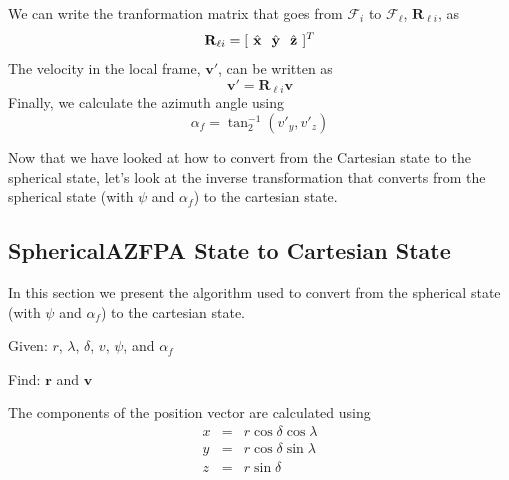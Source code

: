 %
We can write the tranformation matrix that goes from
$\mathcal{F}_{i}$ to $\mathcal{F}_{\ell}$, $\mathbf{R}_{\ell i}$,
as
%
\begin{equation}
    \mathbf{R}_{\ell i} = [\hspace{.05 in} \hat{\mathbf{x}} \hspace{.1 in}
    \hat{\mathbf{y}} \hspace{.1in} \hat{\mathbf{z}} \hspace{.05 in}]^T
\end{equation}
%
The velocity in the local frame,  $\mathbf{v}'$, can be written as
%
\begin{equation}
    \mathbf{v}' = \mathbf{R}_{\ell i}\mathbf{v}
\end{equation}
%
Finally, we calculate the azimuth angle using
\begin{equation}
     \alpha_f = \tan^{-1}_2( v'_y, v'_z )
\end{equation}

Now that we have looked at how to convert from the Cartesian state
to the spherical state, let's look at the inverse transformation
that converts from the spherical state (with $\psi$ and
$\alpha_f$) to the cartesian state.

\subsection{SphericalAZFPA State to Cartesian State}   \label{Sec:SphericalAZFPAtoCartesian}

In this section we present the algorithm used to convert from the
spherical state (with $\psi$ and $\alpha_f$) to the cartesian
state.

\noindent Given: $r$, $\lambda$, $\delta$, $v$, $\psi$, and
$\alpha_f$

\noindent Find:  $\mathbf{r}$ and $\mathbf{v}$

The components of the position vector are calculated using
%
\begin{eqnarray}
     x &=& r\cos{\delta} \cos{ \lambda } \label{Eq:Sphericalx}\\
     y &=& r\cos{\delta}\sin{\lambda}  \label{Eq:Sphericaly}\\
     z &=& r\sin{\delta} \label{Eq:Sphericalz}
\end{eqnarray}
%

